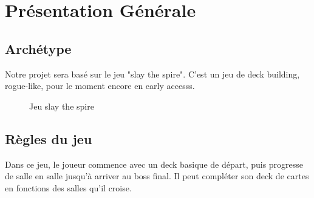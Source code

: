 \section{Présentation Générale}

\subsection{Archétype}

Notre projet sera basé sur le jeu "slay the spire". C'est un jeu de deck building, rogue-like, pour le moment encore en early accesss.



\begin{figure}[h]
\begin{center}
%
\qquad
{}%
\caption{\label{slaythespiregame}Jeu slay the spire}
\end{center}
\end{figure}

\subsection{Règles du jeu}

Dans ce jeu, le joueur commence avec un deck basique de départ, puis progresse de salle en salle jusqu'à arriver au boss final. Il peut compléter son deck de cartes en fonctions des salles qu'il croise. 


